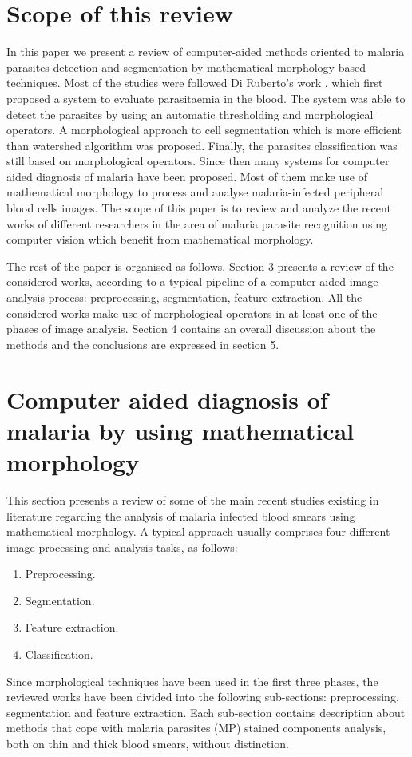 \documentclass[sensors,review,submit,moreauthors,pdftex,10pt,a4paper]{mdpi}
\begin{document}
\section{Scope of this review}
In this paper we present a review of computer-aided methods oriented to malaria parasites detection and segmentation by mathematical morphology based techniques.
Most of the studies were followed Di Ruberto's work \cite{DiRuberto2002}, which first proposed a system to evaluate parasitaemia in the blood. The system was able to detect the parasites by using an automatic thresholding and morphological operators. A morphological approach to cell segmentation which is more efficient than watershed algorithm \cite{Soille2004} was proposed. Finally, the parasites classification was still based on morphological operators. Since then many systems for computer aided diagnosis of malaria have been proposed. Most of them make use of mathematical morphology to process and analyse malaria-infected peripheral blood cells images. The scope of this paper is to review and analyze the recent works of different researchers in the area of malaria parasite recognition using computer vision which benefit from mathematical morphology.

The rest of the paper is organised as follows. Section 3 presents a review of the considered works, according to a typical pipeline of a computer-aided image analysis process: preprocessing, segmentation, feature extraction.
All the considered works make use of morphological operators in at least one of the phases of image analysis. Section 4 contains an overall discussion about the methods and the conclusions are expressed in section 5.

\section{Computer aided diagnosis of malaria by using mathematical morphology}
This section presents a review of some of the main recent studies existing in literature regarding the analysis of malaria infected blood smears using mathematical morphology.
A typical approach usually comprises four different image processing and analysis tasks, as follows:
\begin{enumerate}
	\item Preprocessing.
	\item Segmentation.
	\item Feature extraction.
	\item Classification.
\end{enumerate}
Since morphological techniques have been used in the first three phases, the reviewed works have been divided into the following sub-sections: preprocessing, segmentation and feature extraction.
Each sub-section contains description about methods that cope with malaria parasites (MP) stained components analysis, both on thin and thick blood smears, without distinction.
\end{document}
